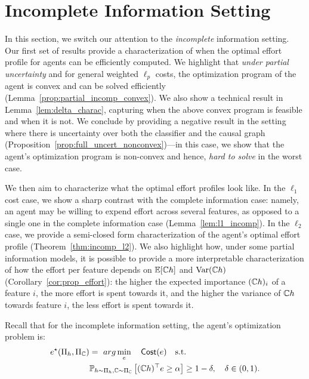 \section{Incomplete Information Setting}\label{sec:incomplete}
In this section, we switch our attention to the \emph{incomplete} information setting. Our first set of results provide a characterization of when the optimal effort profile for agents can be efficiently computed. We highlight that \emph{under partial uncertainty} and for general weighted $\ell_p$ costs, the optimization program of the agent is convex and can be solved efficiently (Lemma~\ref{prop:partial_incomp_convex}). We also show a technical result in Lemma~\ref{lem:delta_charac}, capturing when the above convex program is feasible and when it is not. We conclude by providing a negative result in the setting where there is uncertainty over both the classifier and the causal graph (Proposition~\ref{prop:full_uncert_nonconvex})---in this case, we show that the agent's optimization program is non-convex and hence, \emph{hard to solve} in the worst case. 

We then aim to characterize what the optimal effort profiles look like. In the $\ell_1$ cost case, we show a sharp contrast with the complete information case: namely, an agent may be willing to expend effort across several features, as opposed to a single one in the complete information case (Lemma~\ref{lem:l1_incomp}). In the $\ell_2$ case, we provide a semi-closed form characterization of the agent's optimal effort profile (Theorem~\ref{thm:incomp_l2}). We also highlight how, under some partial information models, it is possible to provide a more interpretable characterization of how the effort per feature depends on $\mathbb{E}[\mathbb{C} h]$ and $\text{Var}(\mathbb{C} h)$ (Corollary~\ref{cor:prop_effort}): the higher the expected importance $(\mathbb{C} h)_i$ of a feature $i$, the more effort is spent towards it, and the higher the variance of $\mathbb{C} h$ towards feature $i$, the less effort is spent towards it. 

Recall that for the incomplete information setting, the agent's optimization problem is: 
\begin{align}\label{opt:agent_br_incomp}
    e^{\star}(\Pi_h, \Pi_{\mathbb{C}}) &= ~arg\min_{e} \quad \textsf{Cost}(e) \quad \text{s.t.}\\
    &\mathbb{P}_{h \sim \Pi_h, \mathbb{C} \sim \Pi_{\mathbb{C}}}\left[ (\mathbb{C} h)^{\top}e \geq \alpha \right] \geq 1-\delta, \quad \delta \in (0,1). \nonumber
\end{align}

